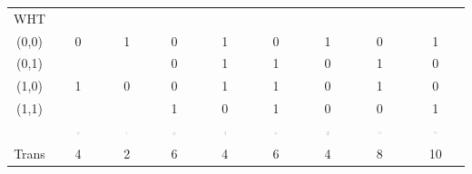 \begin{table}
\begin{tabular}{|c|c|c|c|c|c|c|c|c|}
			\hline
				WHT & & & & & & & &\\
				(0,0) & 0 & 1 & 0 & 1 & 0 & 1 & 0 & 1\\
				(0,1) &   &   & 0 & 1 & 1 & 0 & 1 & 0\\
				(1,0) & 1 & 0 & 0 & 1 & 1 & 0 & 1 & 0\\
				(1,1) &   &   & 1 & 0 & 1 & 0 & 0 & 1\\
			\hline
				& 
				\includegraphics[width=0.1\textwidth]{pics/gates_schematic/buffer} & 
				\includegraphics[width=0.08\textwidth]{pics/gates_schematic/inverter} & 
				\includegraphics[width=0.1\textwidth]{pics/gates_schematic/AND} &
				\includegraphics[width=0.1\textwidth]{pics/gates_schematic/NAND} &
				\includegraphics[width=0.1\textwidth]{pics/gates_schematic/OR} &
				\includegraphics[width=0.1\textwidth]{pics/gates_schematic/NOR} & 
				\includegraphics[width=0.1\textwidth]{pics/gates_schematic/XOR} & 
				\includegraphics[width=0.1\textwidth]{pics/gates_schematic/XNOR} \\
			\hline
				Trans & 4 & 2 & 6 & 4 & 6 & 4 & 8 & 10\\
			\hline
		\end{tabular}
\end{table}